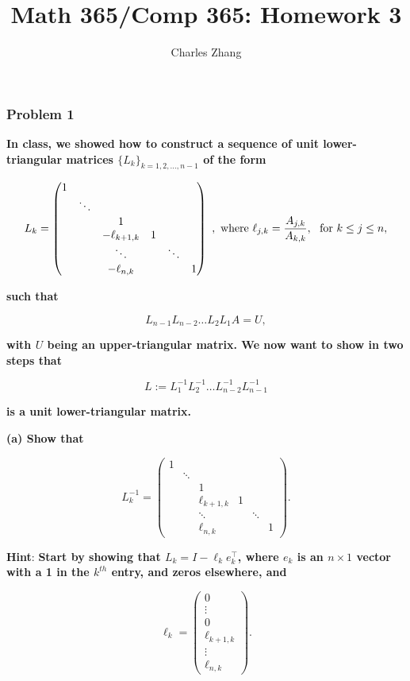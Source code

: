 \documentclass[]{article}
\title{Math 365/Comp 365: Homework 3}
\author{Charles Zhang}
\date{}
\begin{document}
\maketitle

\hypertarget{problem-1}{%
\subsubsection{Problem 1}\label{problem-1}}

\textbf{In class, we showed how to construct a sequence of unit
lower-triangular matrices \(\{L_{k}\}_{k=1,2,\ldots,n-1}\) of the form}

\[ 
L_{k}=\begin{pmatrix} 1 & & & & & \\
& \ddots & & & & \\
& & 1 & & & \\
& & -\ell_{k+1,k} & 1 & & \\
& & \ddots & & \ddots & \\
& & -\ell_{n,k} & &  & 1 
\end{pmatrix}~, \hbox{ where } \ell_{j,k}=\frac{A_{j,k}}{A_{k,k}},~\hbox{ for } k\leq j \leq n, 
\]

\textbf{such that}

\[ L_{n-1} L_{n-2} \ldots L_{2} L_{1} A = U, \]

\textbf{with \(U\) being an upper-triangular matrix. We now want to show
in two steps that}

\[L:= L_{1}^{-1} L_{2}^{-1} \ldots L_{n-2}^{-1} L_{n-1}^{-1} \]

\textbf{is a unit lower-triangular matrix.}

\textbf{(a) Show that}

\[  
L_{k}^{-1} = \begin{pmatrix} 1 & & & & & \\
& \ddots & & & & \\
& & 1 & & & \\
& & \ell_{k+1,k} & 1 & & \\
& & \ddots & & \ddots & \\
& & \ell_{n,k} & &  & 1 
\end{pmatrix}. 
\]

\textbf{Hint}: \textbf{Start by showing that
\(L_k=I-\ell_k e_k^{\top}\), where \(e_k\) is an \(n \times 1\) vector
with a 1 in the \(k^{th}\) entry, and zeros elsewhere, and}

\[ \ell_k = \begin{pmatrix} 0 \\ \vdots \\ 0 \\ \ell_{k+1,k} \\ \vdots \\ \ell_{n,k} \end{pmatrix}. \]
\end{document}
